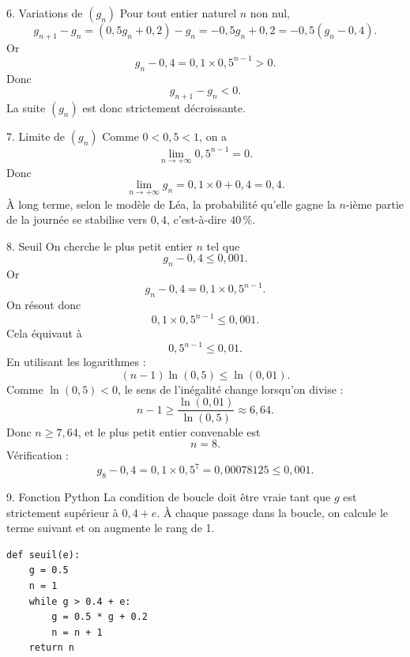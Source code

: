 \documentclass[11pt,a4paper]{article}
\begin{document}
\begin{correctionbox}{6. Variations de $(g_n)$}
Pour tout entier naturel $n$ non nul,
\[
g_{n+1}-g_n=(0{,}5g_n+0{,}2)-g_n=-0{,}5g_n+0{,}2=-0{,}5(g_n-0{,}4).
\]
Or
\[
g_n-0{,}4=0{,}1\times0{,}5^{n-1}>0.
\]
Donc
\[
g_{n+1}-g_n<0.
\]
La suite $(g_n)$ est donc strictement décroissante.
\end{correctionbox}

\begin{correctionbox}{7. Limite de $(g_n)$}
Comme $0<0{,}5<1$, on a
\[
\lim_{n\to+\infty}0{,}5^{n-1}=0.
\]
Donc
\[
\lim_{n\to+\infty}g_n=0{,}1\times0+0{,}4=0{,}4.
\]
À long terme, selon le modèle de Léa, la probabilité qu'elle gagne la $n$-ième partie de la journée se stabilise vers $0{,}4$, c'est-à-dire $40\,\%$.
\end{correctionbox}

\begin{correctionbox}{8. Seuil}
On cherche le plus petit entier $n$ tel que
\[
g_n-0{,}4\leqslant0{,}001.
\]
Or
\[
g_n-0{,}4=0{,}1\times0{,}5^{n-1}.
\]
On résout donc
\[
0{,}1\times0{,}5^{n-1}\leqslant0{,}001.
\]
Cela équivaut à
\[
0{,}5^{n-1}\leqslant0{,}01.
\]
En utilisant les logarithmes :
\[
(n-1)\ln(0{,}5)\leqslant \ln(0{,}01).
\]
Comme $\ln(0{,}5)<0$, le sens de l'inégalité change lorsqu'on divise :
\[
n-1\geqslant \dfrac{\ln(0{,}01)}{\ln(0{,}5)}\approx6{,}64.
\]
Donc $n\geqslant7{,}64$, et le plus petit entier convenable est
\[
\boxed{n=8}.
\]
Vérification :
\[
g_8-0{,}4=0{,}1\times0{,}5^7=0{,}00078125\leqslant0{,}001.
\]
\end{correctionbox}

\begin{correctionbox}{9. Fonction Python}
La condition de boucle doit être vraie tant que $g$ est strictement supérieur à $0{,}4+e$. À chaque passage dans la boucle, on calcule le terme suivant et on augmente le rang de 1.

\begin{lstlisting}
def seuil(e):
    g = 0.5
    n = 1
    while g > 0.4 + e:
        g = 0.5 * g + 0.2
        n = n + 1
    return n
\end{lstlisting}
\end{correctionbox}
\end{document}

